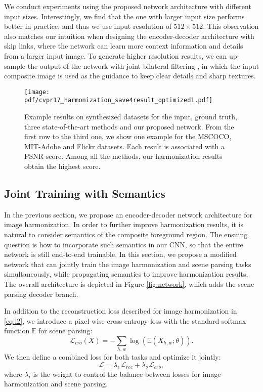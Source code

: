 \documentclass[10pt,twocolumn,letterpaper]{article}
\begin{document}
{}
%
We conduct experiments using the proposed network architecture with different input sizes. 
%
Interestingly, we find that the one with larger input size 
performs better in practice, and thus we use input resolution of $512 \times 512$.
%
This observation also matches our intuition when designing the encoder-decoder architecture with skip links, where the network can learn more context information and details from a larger input image.
%
To generate higher resolution results, we can up-sample the output of the network with joint bilateral filtering \cite{Petschnigg_SIGGRAPH_2004}, in which the input composite image is used as the guidance to keep clear details and sharp textures.
%
\begin{figure*}[t]
	\centering
	\texttt{[image: pdf/cvpr17\_harmonization\_save4result\_optimized1.pdf]}
	\caption{Example results on synthesized datasets for the input, ground truth, three state-of-the-art methods and our proposed network. From the first row to the third one, we show one example for the MSCOCO, MIT-Adobe and Flickr datasets. Each result is associated with a PSNR score. Among all the methods, our harmonization results obtain the highest score.
	}
	\label{fig:synthesize}
\end{figure*}
%
\subsection{Joint Training with Semantics}
%
In the previous section, we propose an encoder-decoder network architecture for image harmonization.
%
In order to further improve harmonization results, it is natural to consider semantics of the composite foreground region. 
%
The ensuing question is how to incorporate such semantics in our CNN, so that the entire network is still end-to-end trainable.
%
In this section, we propose a modified network that can jointly train the image harmonization and scene parsing tasks simultaneously, while propagating semantics to improve harmonization results.
%
The overall architecture is depicted in Figure \ref{fig:network}, which adds the scene parsing decoder branch.
%

{}
%
In addition to the reconstruction loss described for image harmonization in \eqref{eq:l2}, we introduce a pixel-wise cross-entropy loss with the standard softmax function $\mathbb{E}$ for scene parsing:
%
\begin{equation}
\mathcal{L}_{cro}(X) = -\sum_{h,w} \log (\mathbb{E}(X_{h,w};\theta)).
\label{eq:softmax}
\end{equation}
%
We then define a combined loss for both tasks and optimize it jointly:
%
\begin{equation}
\mathcal{L} = \lambda_{1} \mathcal{L}_{rec} + \lambda_{2}\mathcal{L}_{cro},
\label{eq:combine}
\end{equation}
%
where $\lambda_{i}$ is the weight to control the balance between losses for image harmonization and scene parsing.
%
\end{document}
